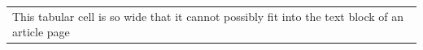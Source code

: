 \noindent\begin{tabular}{l}
This tabular cell is so wide that it cannot possibly fit into the text block of an article page
\end{tabular}
